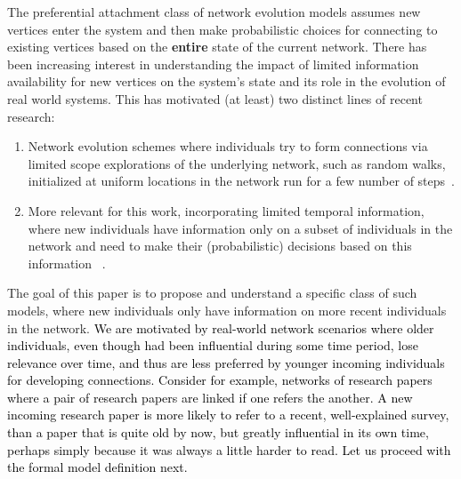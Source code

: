 \documentclass[letterpaper,11pt,reqno]{amsart}
\newenvironment{enumeratea}{\begin{enumerate}[\upshape a)]\setlength{\itemsep}{1ex}}{\end{enumerate}}
\theoremstyle{definition}
\begin{document}
The preferential attachment class of network evolution models assumes new vertices enter the system and then make probabilistic choices for connecting to existing vertices based on the {\bf entire} state of the current network.  There has been increasing interest in understanding the impact of limited information availability for new vertices on the system's state and its role in the evolution of real world systems. This has motivated (at least) two distinct lines of recent research:
\begin{enumeratea}
\item  Network evolution schemes where individuals try to form connections via limited scope explorations of the underlying network,  such as random walks,  initialized at uniform locations in the network run for a few number of steps~\cites{krapvisky2023magic, banerjee2024co, berry2024random,englander2025structural}. 

\item  More relevant for this work, incorporating limited temporal information,  where new individuals have information only on a subset of individuals in the network and need to make their (probabilistic) decisions based on this information ~\cites{baccelli2019renewal,king2021fluid,dey2022asymptotic,BBDS04_meso,BBDS04_macro}. 
\end{enumeratea}
The goal of this paper is to propose and understand a specific class of such models, where new individuals only have information on more recent individuals in the network. \textcolor{black}{We are motivated by real-world network scenarios where older individuals, even though had been influential during some time period, lose relevance over time, and thus are less preferred by younger incoming individuals for developing connections. Consider for example, networks of research papers where a pair of research papers are linked if one refers the another. A new incoming research paper is more likely to refer to a recent, well-explained survey, than a paper that is quite old by now, but greatly influential in its own time, perhaps simply because it was always a little harder to read. Let us proceed with the formal model definition next.}

\end{document}
